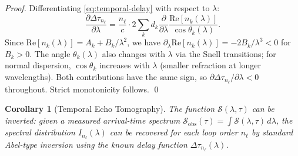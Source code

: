 \documentclass[11pt,twocolumn,a4paper]{article}
\theoremstyle{plain}
\newtheorem{corollary}[theorem]{Corollary}
\theoremstyle{definition}
\theoremstyle{remark}
\begin{document}
\begin{proof}
Differentiating \eqref{eq:temporal-delay} with respect to $\lambda$:
\[
  \frac{\partial\Delta\tau_{n_\ell}}{\partial\lambda} = \frac{n_\ell}{c}\cdot 2\sum_k d_k\frac{\partial}{\partial\lambda}\frac{\mathrm{Re}[n_k(\lambda)]}{\cos\theta_k(\lambda)}.
\]
Since $\mathrm{Re}[n_k(\lambda)]=A_k+B_k/\lambda^2$, we have $\partial_\lambda \mathrm{Re}[n_k(\lambda)]=-2B_k/\lambda^3<0$ for $B_k>0$. The angle $\theta_k(\lambda)$ also changes with $\lambda$ via the Snell transitions; for normal dispersion, $\cos\theta_k$ increases with $\lambda$ (smaller refraction at longer wavelengths). Both contributions have the same sign, so $\partial\Delta\tau_{n_\ell}/\partial\lambda<0$ throughout. Strict monotonicity follows. \qed
\end{proof}

\begin{corollary}[Temporal Echo Tomography]
\label{cor:echo-tomography}
The function $\mathcal{S}(\lambda,\tau)$ can be inverted: given a measured arrival-time spectrum $\mathcal{S}_\text{obs}(\tau)=\int\mathcal{S}(\lambda,\tau)\,d\lambda$, the spectral distribution $I_{n_\ell}(\lambda)$ can be recovered for each loop order $n_\ell$ by standard Abel-type inversion using the known delay function $\Delta\tau_{n_\ell}(\lambda)$.
\end{corollary}
\end{document}
